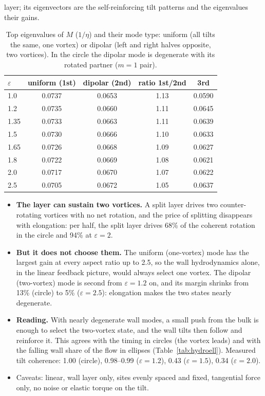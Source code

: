 layer; its eigenvectors are the self-reinforcing tilt patterns and the eigenvalues their gains.
\begin{table}[H]\centering\small
\caption{Top eigenvalues of $M$ ($1/\eta$) and their mode type: uniform (all tilts the same, one vortex) or dipolar (left and right halves opposite, two vortices).
In the circle the dipolar mode is degenerate with its rotated partner ($m=1$ pair).}\label{tab:tiltmodes}
\begin{tabular}{lcccc}\toprule
$\varepsilon$ & uniform (1st) & dipolar (2nd) & ratio 1st/2nd & 3rd\\\midrule
1.0 & 0.0737 & 0.0653 & 1.13 & 0.0590\\
1.2 & 0.0735 & 0.0660 & 1.11 & 0.0645\\
1.35 & 0.0733 & 0.0663 & 1.11 & 0.0639\\
1.5 & 0.0730 & 0.0666 & 1.10 & 0.0633\\
1.65 & 0.0726 & 0.0668 & 1.09 & 0.0627\\
1.8 & 0.0722 & 0.0669 & 1.08 & 0.0621\\
2.0 & 0.0717 & 0.0670 & 1.07 & 0.0622\\
2.5 & 0.0705 & 0.0672 & 1.05 & 0.0637\\\bottomrule
\end{tabular}
\end{table}
\begin{itemize}
  \item \textbf{The layer can sustain two vortices.} A split layer drives two counter-rotating vortices with no net rotation, and the price of splitting
        disappears with elongation: per half, the split layer drives 68\% of the coherent rotation in the circle and 94\% at $\varepsilon=2$.
  \item \textbf{But it does not choose them.} The uniform (one-vortex) mode has the largest gain at every aspect ratio up to 2.5, so the wall
        hydrodynamics alone, in the linear feedback picture, would always select one vortex. The dipolar (two-vortex) mode is second from $\varepsilon=1.2$
        on, and its margin shrinks from 13\% (circle) to 5\% ($\varepsilon=2.5$): elongation makes the two states nearly degenerate.
  \item \textbf{Reading.} With nearly degenerate wall modes, a small push from the bulk is enough to select the two-vortex state, and the wall tilts then
        follow and reinforce it. This agrees with the timing in circles (the vortex leads) and with the falling wall share of the flow in ellipses
        (Table~\ref{tab:hydroell}). Measured tilt coherence: 1.00 (circle), 0.98--0.99 ($\varepsilon=1.2$), 0.43 ($\varepsilon=1.5$), 0.34 ($\varepsilon=2.0$).
  \item Caveats: linear, wall layer only, sites evenly spaced and fixed, tangential force only, no noise or elastic torque on the tilt.
\end{itemize}


